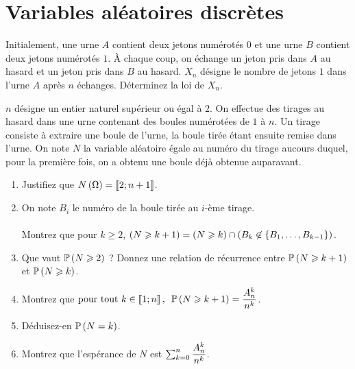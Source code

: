 \chapter{Variables aléatoires discrètes}

\minitoc

\legendeexercices

\begin{exoss}
Initialement, une urne \(A\) contient deux jetons numérotés \(0\) et une urne \(B\) contient deux jetons numérotés \(1\). À chaque coup, on échange un jeton pris dans \(A\) au hasard et un jeton pris dans \(B\) au hasard. \(X_n\) désigne le nombre de jetons \(1\) dans l'urne \(A\) après \(n\) échanges. Déterminez la loi de \(X_n\).
\end{exoss}

\begin{exoss}
\(n\) désigne un entier naturel supérieur ou égal à \(2\). On effectue des tirages au hasard dans une urne contenant des boules numérotées de \(1\) à \(n\). Un tirage consiste à extraire une boule de l'urne, la boule tirée étant ensuite remise dans l'urne. On note \(N\) la variable aléatoire égale au numéro du tirage aucours duquel, pour la première fois, on a obtenu une boule déjà obtenue auparavant.

\begin{enumerate}
    \item Justifiez que \(N\paren{\Omega}=\interventierii{2}{n+1}\). \\
    \item On note \(B_i\) le numéro de la boule tirée au \(i\)-ème tirage. \\\\ Montrez que pour \(k\geq2\), \(\paren{N\geq k+1}=\paren{N\geq k}\inter\paren{B_k\not\in\accol{B_1,\dots,B_{k-1}}}\). \\
    \item Que vaut \(\proba{N\geq2}\) ? Donnez une relation de récurrence entre \(\proba{N\geq k+1}\) et \(\proba{N\geq k}\). \\
    \item Montrez que \(\quantifs{\tpt k\in\interventierii{1}{n}}\proba{N\geq k+1}=\dfrac{\arr{k}{n}}{n^k}\). \\
    \item Déduisez-en \(\proba{N=k}\). \\
    \item Montrez que l'espérance de \(N\) est \(\sum_{k=0}^n\dfrac{\arr{k}{n}}{n^k}\).
\end{enumerate}
\end{exoss}

